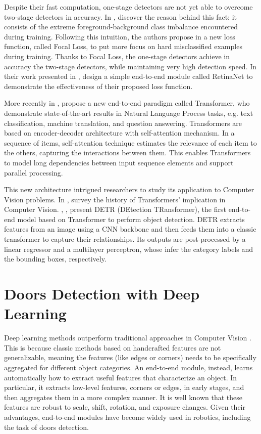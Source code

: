  Despite their fast computation, one-stage detectors are not yet able to overcome two-stage detectors in accuracy. In \cite{focalloss}, \citeauthor{focalloss} discover the reason behind this fact: it consists of the extreme foreground-background class imbalance encountered during training. Following this intuition, the authors propose in \cite{focalloss} a new loss function, called Focal Loss, to put more focus on hard misclassified examples during training. Thanks to Focal Loss, the one-stage detectors achieve in accuracy the two-stage detectors, while maintaining very high detection speed. In their work presented in \cite{focalloss}, \citeauthor{focalloss} design a simple end-to-end module called RetinaNet to demonstrate the effectiveness of their proposed loss function. 
 
 More recently in \cite{transformer}, \citeauthor{transformer} propose a new end-to-end paradigm called Transformer, who demonstrate state-of-the-art results in Natural Language Process tasks, e.g. text classification, machine translation, and question answering. Transformers are based on encoder-decoder architecture with self-attention mechanism. In a sequence of items, self-attention technique estimates the relevance of each item to the others, capturing the interactions between them. This enables Transformers to model long dependencies between input sequence elements and support parallel processing. 
 
 This new architecture intrigued researchers to study its application to Computer Vision problems. In \cite{surveytransformer}, \citeauthor{surveytransformer} survey the history of Transformers' implication in Computer Vision. \citeauthor{detr}, \cite{detr}, present DETR (DEtection TRansformer), the first end-to-end model based on Transformer to perform object detection. DETR extracts features from an image using a CNN backbone and then feeds them into a classic transformer to capture their relationships. Its outputs are post-processed by a linear regressor and a multilayer perceptron, whose infer the category labels and the bounding boxes, respectively.
 
 \section{Doors Detection with Deep Learning} 
 Deep learning methods outperform traditional approaches in Computer Vision \cite{deeplearningoverview}. This is because classic methods based on handcrafted features are not generalizable, meaning the features (like edges or corners) needs to be specifically aggregated for different object categories. An end-to-end module, instead, learns automatically how to extract useful features that characterize an object. In particular, it extracts low-level features, corners or edges, in early stages, and then aggregates them in a more complex manner. It is well known that these features are robust to scale, shift, rotation, and exposure changes. Given their advantages, end-to-end modules have become widely used in robotics, including the task of doors detection.
 
